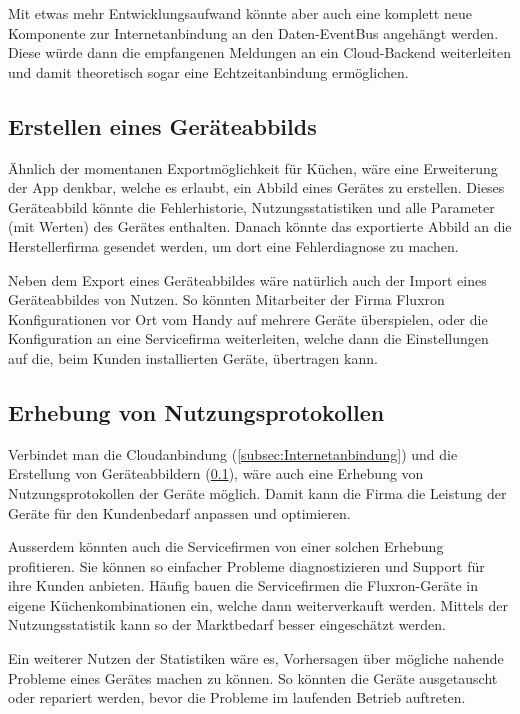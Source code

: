 Mit etwas mehr Entwicklungsaufwand könnte aber auch eine komplett neue Komponente zur Internetanbindung an den Daten-EventBus angehängt werden. Diese würde dann die empfangenen Meldungen an ein Cloud-Backend weiterleiten und damit theoretisch sogar eine Echtzeitanbindung ermöglichen.

\subsection{Erstellen eines Geräteabbilds}
\label{subsec:WeiterleitenVonFehlern}

Ähnlich der momentanen Exportmöglichkeit für Küchen, wäre eine Erweiterung der App denkbar, welche es erlaubt, ein Abbild eines Gerätes zu erstellen. Dieses Geräteabbild könnte die Fehlerhistorie, Nutzungsstatistiken und alle Parameter (mit Werten) des Gerätes enthalten. Danach könnte das exportierte Abbild an die Herstellerfirma gesendet werden, um dort eine Fehlerdiagnose zu machen.

Neben dem Export eines Geräteabbildes wäre natürlich auch der Import eines Geräteabbildes von Nutzen. So könnten Mitarbeiter der Firma Fluxron Konfigurationen vor Ort vom Handy auf mehrere Geräte überspielen, oder die Konfiguration an eine Servicefirma weiterleiten, welche dann die Einstellungen auf die, beim Kunden installierten Geräte, übertragen kann.

\subsection{Erhebung von Nutzungsprotokollen}
\label{subsec:Nutzungsprotokolle}

Verbindet man die Cloudanbindung (\ref{subsec:Internetanbindung}) und die Erstellung von Geräteabbildern (\ref{subsec:WeiterleitenVonFehlern}), wäre auch eine Erhebung von Nutzungsprotokollen der Geräte möglich. Damit kann die Firma die Leistung der Geräte für den Kundenbedarf anpassen und optimieren.

Ausserdem könnten auch die Servicefirmen von einer solchen Erhebung profitieren. Sie können so einfacher Probleme diagnostizieren und Support für ihre Kunden anbieten. Häufig bauen die Servicefirmen die Fluxron-Geräte in eigene Küchenkombinationen ein, welche dann weiterverkauft werden. Mittels der Nutzungsstatistik kann so der Marktbedarf besser eingeschätzt werden.

Ein weiterer Nutzen der Statistiken wäre es, Vorhersagen über mögliche nahende Probleme eines Gerätes machen zu können. So könnten die Geräte ausgetauscht oder repariert werden, bevor die Probleme im laufenden Betrieb auftreten.
